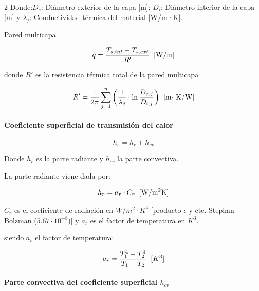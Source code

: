 \documentclass[11pt]{article}
\begin{document}
\begin{multicols*}{2}
    Donde:$D_e$: Diámetro exterior de la capa [m]; $D_i$: Diámetro interior de la capa [m] y $\lambda_j$: Conductividad térmica del material [W/m·K].

    Pared multicapa

    \begin{equation}
        q = \frac{T_{s,int} - T_{s,ext}}{R'} \hspace{0.2cm} \text{[W/m]}
    \end{equation}

    donde $R'$ es la resistencia térmica total de la pared multicapa

    \begin{equation}
        R' = \frac{1}{2\pi} \sum_{j=1}^{n} {\left(\frac{1}{\lambda_j} \cdot \ln\frac{D_{e,j}}{D_{i,j}}\right)} \hspace{0.2cm} \text{[m$\cdot$ K/W]}
    \end{equation}


    \paragraph*{Coeficiente superficial de transmisión del calor}

        \begin{equation}
            h_s = h_r + h_{cv}
        \end{equation}

        Donde $h_r$ es la parte radiante y $h_{cv}$ la parte convectiva.

        La parte radiante viene dada por: 

        \begin{equation}
            h_r = a_r \cdot C_r \hspace{0.2cm} \text{[W/m$^2$K]}
        \end{equation}

        $C_r$ es el coeficiente de radiación en $W/m^2 \cdot K^4$ [producto $\epsilon$ y cte. Stephan Bolzman ($5.67 \cdot 10^{-8}$)] y $a_r$ es el factor de temperatura en $K^3$.

        siendo $a_r$ el factor de temperatura:

        \begin{equation}
            a_r = \frac{T_{1}^4 - T_{2}^4 }{T_1 - T_2} \hspace{0.2cm} \text{[$K^3$]}
        \end{equation}
    

    \paragraph{Parte convectiva del coeficiente superficial $h_{cv}$}


\end{multicols*}
\end{document}
